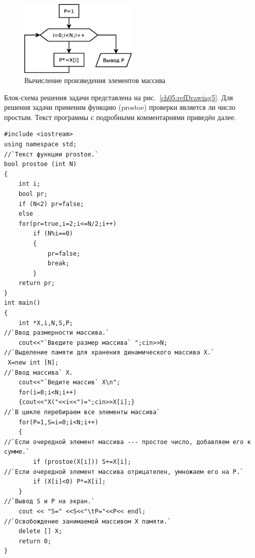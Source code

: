\begin{figure}[htb]
\begin{center}
\includegraphics[width=0.5\textwidth]{img/ris_5_5}
\caption{Вычисление произведения элементов массива}
\label{ch05:refDrawing4}
\end{center}
\end{figure}

Блок-схема решения задачи представлена на рис.~\ref{ch05:refDrawing5}. Для решения задачи применим функцию (prostoe)
проверки является ли число простым. Текст программы с подробными комментариями приведён далее.
\begin{lstlisting}
#include <iostream>
using namespace std;
//`Текст функции prostoe.`
bool prostoe (int N)
{
    int i;
    bool pr;
    if (N<2) pr=false;
    else
    for(pr=true,i=2;i<=N/2;i++)
        if (N%i==0)
        {
            pr=false;
            break;
        }
    return pr;
}
int main()
{
    int *X,i,N,S,P;
//`Ввод размерности массива.`
    cout<<"`Введите размер массива` ";cin>>N;
//`Выделение памяти для хранения динамического массива X.`
 X=new int [N];
//`Ввод массива` X.
    cout<<"`Ведите массив` X\n";
    for(i=0;i<N;i++)
    {cout<<"X("<<i<<")=";cin>>X[i];}
//`В цикле перебираем все элементы массива`
    for(P=1,S=i=0;i<N;i++)
    {
//`Если очередной элемент массива --- простое число, добавляем его к сумме.`
        if (prostoe(X[i])) S+=X[i];
//`Если очередной элемент массива отрицателен, умножаем его на P.`
        if (X[i]<0) P*=X[i];
    }
//`Вывод S и P на экран.`
    cout << "S=" <<S<<"\tP="<<P<< endl;
//`Освобождение занимаемой массивом X памяти.`
    delete [] X;
    return 0;
}
\end{lstlisting}

